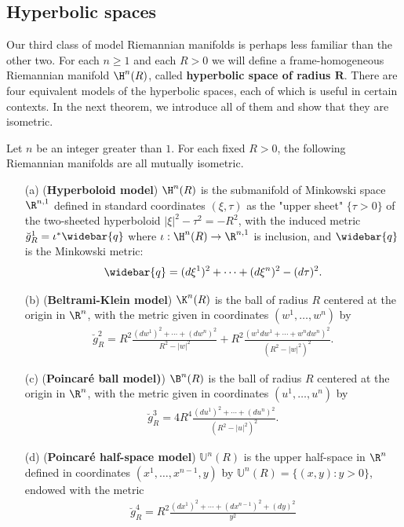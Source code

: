 \subsection{Hyperbolic spaces}
Our third class of model Riemannian manifolds is perhaps less familiar than the other two. For each $n\geq 1$ and each $R>0$ we will define a frame-homogeneous Riemannian manifold $\H^n(R)$, called \textbf{hyperbolic space of radius $\bm{R}$}. There are four equivalent models of the hyperbolic spaces, each of which is useful in certain contexts. In the next theorem, we introduce all of them and show that they are isometric.
\begin{theorem}\label{Hyperbolic space}
Let $n$ be an integer greater than $1$. For each fixed $R>0$, the following Riemannian manifolds 
are all mutually isometric.
\begin{itemize}
\item[(a)] (\textbf{Hyperboloid model}) $\H^n(R)$ is the submanifold of Minkowski space $\R^{n,1}$ 
defined in standard coordinates $(\xi,\tau)$ as the "upper sheet" $\{\tau>0\}$ of the two-sheeted 
hyperboloid $|\xi|^2-\tau^2=-R^2$, with the induced metric $\breve{g}^1_R=\iota^*\widebar{q}$ where 
$\iota:\H^n(R)\to\R^{n,1}$ is inclusion, and $\widebar{q}$ is the Minkowski metric:
\begin{align}\label{Hyperbolic space metric-1}
\widebar{q}=(d\xi^1)^2+\cdots+(d\xi^n)^2-(d\tau)^2.
\end{align}
\item[(b)] (\textbf{Beltrami-Klein model}) $\K^n(R)$ is the ball of radius $R$ centered at the
origin in $\R^n$, with the metric given in coordinates $(w^1,\dots,w^n)$ by
\begin{align}\label{Hyperbolic space metric-2}
\breve{g}^2_R=R^2\frac{(dw^1)^2+\cdots+(dw^n)^2}{R^2-|w|^2}+R^2\frac{(w^1dw^1+\cdots+w^ndw^n)^2}{(R^2-|w|^2)^2}.
\end{align}
\item[(c)] (\textbf{Poincar\'e ball model)}) $\B^n(R)$ is the ball of radius $R$ centered at 
the origin in $\R^n$, with the metric given in coordinates $(u^1,\dots,u^n)$ by
\begin{align}\label{Hyperbolic space metric-3}
\breve{g}^3_R=4R^4\frac{(du^1)^2+\cdots+(du^n)^2}{(R^2-|u|^2)^2}.
\end{align}
\item[(d)] (\textbf{Poincar\'e half-space model}) $\mathbb{U}^n(R)$ is the upper half-space in $\R^n$ 
defined in coordinates $(x^1,\dots,x^{n-1},y)$ by $\mathbb{U}^n(R)=\{(x,y):y>0\}$, endowed with 
the metric
\begin{align}\label{Hyperbolic space metric-4}
\breve{g}^4_R=R^2\frac{(dx^1)^2+\cdots+(dx^{n-1})^2+(dy)^2}{y^2}
\end{align}
\end{itemize}
\end{theorem}
